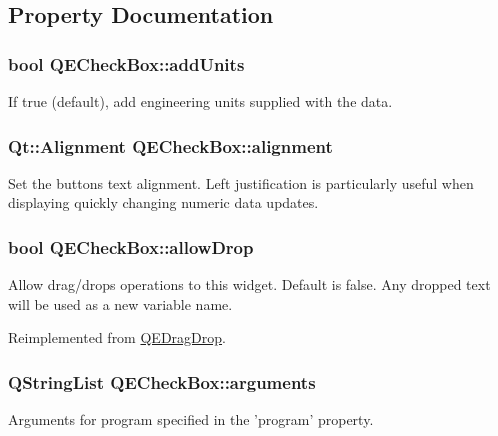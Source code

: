 \subsection{Property Documentation}
\hypertarget{classQECheckBox_a0d336bc2775142c8cafd7693efa41cbf}{
\subsubsection[{addUnits}]{\setlength{\rightskip}{0pt plus 5cm}bool QECheckBox::addUnits}}
\label{classQECheckBox_a0d336bc2775142c8cafd7693efa41cbf}
If true (default), add engineering units supplied with the data. \hypertarget{classQECheckBox_a701a4b21a9a6dd620cf02fe20b338859}{
\subsubsection[{alignment}]{\setlength{\rightskip}{0pt plus 5cm}Qt::Alignment QECheckBox::alignment}}
\label{classQECheckBox_a701a4b21a9a6dd620cf02fe20b338859}
Set the buttons text alignment. Left justification is particularly useful when displaying quickly changing numeric data updates. \hypertarget{classQECheckBox_a90f3257fd26f917ee65cf4d9325bb7ec}{
\subsubsection[{allowDrop}]{\setlength{\rightskip}{0pt plus 5cm}bool QECheckBox::allowDrop}}
\label{classQECheckBox_a90f3257fd26f917ee65cf4d9325bb7ec}
Allow drag/drops operations to this widget. Default is false. Any dropped text will be used as a new variable name. 

Reimplemented from \hyperlink{classQEDragDrop}{QEDragDrop}.

\hypertarget{classQECheckBox_aa8d15e056222f0ee25e9ee067d2638d0}{
\subsubsection[{arguments}]{\setlength{\rightskip}{0pt plus 5cm}QStringList QECheckBox::arguments}}
\label{classQECheckBox_aa8d15e056222f0ee25e9ee067d2638d0}
Arguments for program specified in the 'program' property. 

